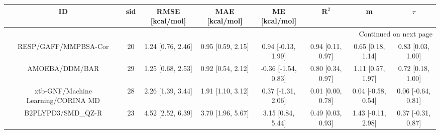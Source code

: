 \documentclass[8pt]{article}
\begin{document}
\begin{center}
\begin{footnotesize}
\begin{longtable}{|cccccccc|}
\toprule
                                 ID & sid &    RMSE [kcal/mol] &     MAE [kcal/mol] &        ME [kcal/mol] &              R$^2$ &                   m &              $\tau$ \\
\midrule
\endhead
\midrule
\multicolumn{8}{r}{{Continued on next page}} \\
\midrule
\endfoot

\bottomrule
\endlastfoot
               RESP/GAFF/MMPBSA-Cor &  20 &  1.24 [0.76, 2.46] &  0.95 [0.59, 2.15] &   0.94 [-0.13, 1.99] &  0.94 [0.11, 0.97] &   0.65 [0.18, 1.14] &   0.83 [0.03, 1.00] \\
                     AMOEBA/DDM/BAR &  29 &  1.25 [0.68, 2.53] &  0.92 [0.54, 2.12] &  -0.36 [-1.54, 0.83] &  0.80 [0.34, 0.97] &   1.11 [0.57, 1.97] &   0.72 [0.18, 1.00] \\
 xtb-GNF/Machine Learning/CORINA MD &  28 &  2.26 [1.39, 3.44] &  1.91 [1.10, 3.12] &   0.37 [-1.31, 2.06] &  0.01 [0.00, 0.78] &  0.04 [-0.58, 0.54] &  0.06 [-0.64, 0.81] \\
                 B2PLYPD3/SMD\_QZ-R &  23 &  4.52 [2.52, 6.39] &  3.70 [1.96, 5.67] &    3.15 [0.84, 5.44] &  0.49 [0.03, 0.93] &  1.43 [-0.11, 2.98] &  0.37 [-0.31, 0.87] \\
\end{longtable}
\end{footnotesize}
\end{center}
\end{document}
